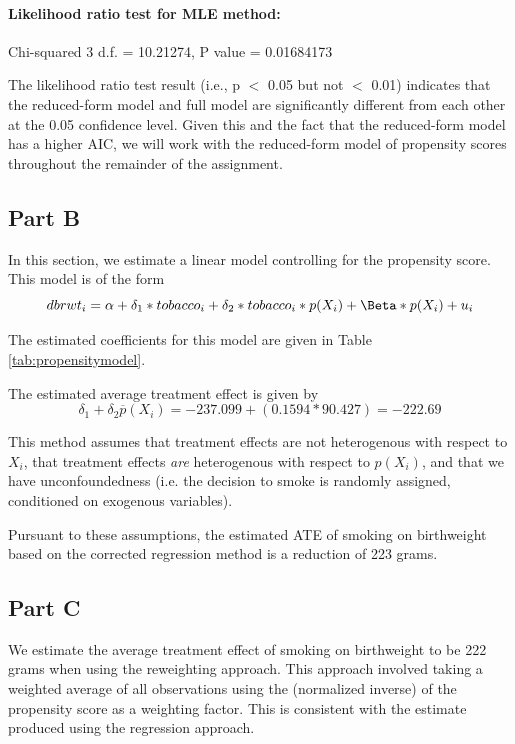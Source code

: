 \documentclass[letterpaper, 12pt]{article}
\begin{document}
\paragraph{Likelihood ratio test for MLE method:} Chi-squared 3 d.f. =  10.21274, P value =  0.01684173 

The likelihood ratio test result (i.e., p $<$ 0.05 but not $<$ 0.01) indicates that the reduced-form model and full model are significantly different from each other at the 0.05 confidence level. Given this and the fact that the reduced-form model has a higher AIC, we will work with the reduced-form model of propensity scores throughout the remainder of the assignment.

\subsection{Part B}

In this section, we estimate a linear model controlling for the propensity score. This model is of the form
\begin{equation*}
dbrwt_i = \alpha + \delta_1 * tobacco_i + \delta_2 * tobacco_i * p(X_i) + \Beta * p(X_i) + u_i
\end{equation*}

The estimated coefficients for this model are given in Table \ref{tab:propensitymodel}. 



The estimated average treatment effect is given by 
\begin{equation}
\delta_1 + \delta_2 \overline{p}(X_i)=-237.099 + (0.1594 * 90.427)=-222.69
\end{equation}

This method assumes that treatment effects are not heterogenous with respect to $X_i$, that treatment effects \emph{are} heterogenous with respect to $p(X_i)$, and that we have unconfoundedness (i.e. the decision to smoke is randomly assigned, conditioned on exogenous variables).

Pursuant to these assumptions, the estimated ATE of smoking on birthweight based on the corrected regression method is a reduction of 223 grams.

\subsection{Part C}
We estimate the average treatment effect of smoking on birthweight to be 222 grams when using the reweighting approach. This approach involved taking a weighted average of all observations using the (normalized inverse) of the propensity score as a weighting factor. This is consistent with the estimate produced using the regression approach.
\end{document}
